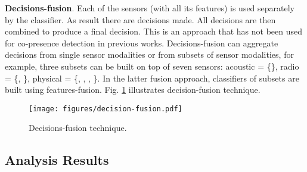 {\textbf{Decisions-fusion}. Each of the  sensors (with all its features) is used separately by the
classifier. As result there are  decisions made.  All decisions are then
combined to produce a final decision. This is an approach that has not been
used for co-presence detection in previous works. Decisions-fusion can
aggregate decisions from single sensor modalities or from subsets of sensor
modalities, for example, three subsets can be built on top of seven sensors:
acoustic = \{\audio\}, radio = \{\bluetooth, \wifi\}, physical = \{\altitude,
\gas, \humidity, \temperature\}. In the latter fusion approach, classifiers of
subsets are built using features-fusion. Fig. \ref{fig:decision-fusion} illustrates decision-fusion technique.

\begin{figure}[htpb] 
	\centering
	\texttt{[image: figures/decision-fusion.pdf]}
	\caption{Decisions-fusion technique.}
	\label{fig:decision-fusion}
\end{figure} 

} 

\begin{comment}
We consider two methods to aggregate decisions. The first method is based on a simple
majority voting
(hereafter referred to as \emph{equal voting})
 which takes binary decisions from all sensors with equal
weights. The second method 
is a novel variant, we call \emph{weighted voting}, which
fuses decisions with different weights assigned to
each sensor. We start with a list of sensors, , sorted by the order
of attack resilience according to the single modality attack, the weight assigned
to  is computed as: , where ,  is the
position of  in the sorted list. As an example, the decisions-fusion weighted voting for Audio-Radio is done as follows. Sensors \audio, \bluetooth, \wifi have performance: 3\%,
2.7\%, 99.8\% (Table \ref{tbl:all-mani}), respectively. The sorted
list is therefore [\wifi, \audio, \bluetooth]. When these sensors are fused, their weights will
be assigned as: 1/6 for \wifi, 2/6 for \audio and 3/6 for \bluetooth. Note that
in equal voting, the weight of each sensor is 1/3. 
When more sensors are fused, weights will be adapted with similar scheme.
}

\end{comment}








\subsection{Analysis Results}


